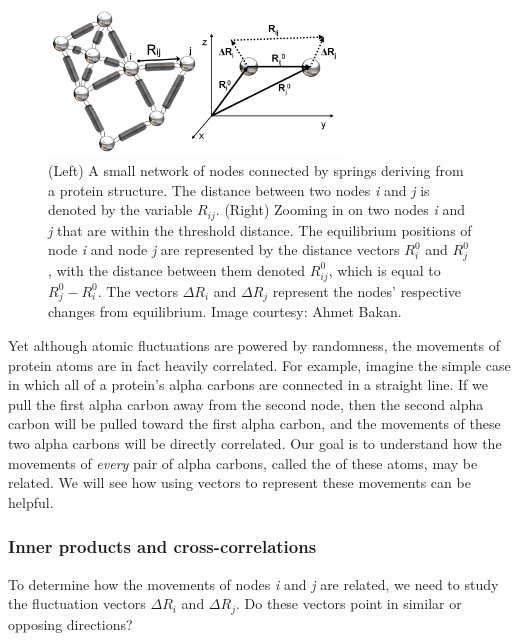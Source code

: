 \begin{figure}[h]
	\centering
	\mySfFamily
	\includegraphics[width = 0.7\textwidth]{../images/gaussian_fluctuations.png}
	\caption{(Left) A small network of nodes connected by springs deriving from a protein structure. The distance between two nodes \textit{i} and \textit{j} is denoted by the variable $ R_{ij} $. (Right) Zooming in on two nodes \textit{i} and \textit{j} that are within the threshold distance. The equilibrium positions of node \textit{i} and node \textit{j} are represented by the distance vectors $ R_i^0 $ and $ R_j^0 $, with the distance between them denoted $ R_{ij}^0 $, which is equal to $ R_j^0 - R_i^0 $. The vectors $ \Delta R_i $ and $ \Delta R_j $ represent the nodes' respective changes from equilibrium. Image courtesy: Ahmet Bakan.}
	\label{fig:gaussian_fluctuations}
\end{figure}

Yet although atomic fluctuations are powered by randomness, the movements of protein atoms are in fact heavily correlated. For example, imagine the simple case in which all of a protein's alpha carbons are connected in a straight line. If we pull the first alpha carbon away from the second node, then the second alpha carbon will be pulled toward the first alpha carbon, and the movements of these two alpha carbons will be directly correlated. Our goal is to understand how the movements of \textit{every} pair of alpha carbons, called the  of these atoms, may be related. We will see how using vectors to represent these movements can be helpful.

\FloatBarrier
{}
\subsubsection{Inner products and cross-correlations}

To determine how the movements of nodes \textit{i} and \textit{j} are related, we need to study the fluctuation vectors $ \Delta R_i $ and $ \Delta R_j $. Do these vectors point in similar or opposing directions?

